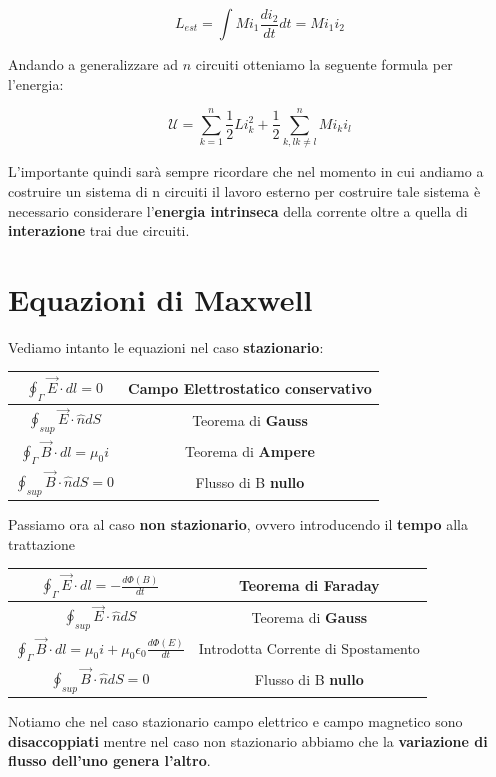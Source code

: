 $$
L_{est} = \int Mi_1\frac{di_2}{dt}dt = Mi_1i_2
$$

Andando a generalizzare ad $n$ circuiti otteniamo la seguente formula per l'energia: 

\begin{large}
	\begin{equation} \label{eq_energia_n_circuiti_RL}
		\mathcal{U} = \sum_{k=1}^{n} \frac{1}{2} Li_k^2  + \frac{1}{2} \sum_{k,l k\ne l}^n M i_k i_l
	\end{equation}
\end{large}

L'importante quindi sarà sempre ricordare che nel momento in cui andiamo a costruire un sistema di n circuiti il lavoro esterno per costruire tale sistema è necessario considerare l'\textbf{energia intrinseca} della corrente oltre a quella di \textbf{interazione} trai due circuiti. 


\section{Equazioni di Maxwell}
Vediamo intanto le equazioni nel caso \textbf{stazionario}: 
\bigskip

\begin{center}
\begin{large}
	\begin{tabular}{|c|c|}
		\hline
		$\oint_{\Gamma} \vec{E} \cdot dl = 0 $	& Campo Elettrostatico \textbf{conservativo} \\	
		\hline
		$\oint_{sup} \vec{E} \cdot \hat{n} dS$ & Teorema di \textbf{Gauss} \\
		\hline
		$\oint_{\Gamma} \vec{B} \cdot dl = \mu_0 i$ & Teorema di \textbf{Ampere} \\ 
		\hline
		$\oint_{sup} \vec{B} \cdot \hat{n}dS = 0$ &   Flusso di B \textbf{nullo} \\
		\hline
	\end{tabular}
\end{large}

\end{center}

\bigskip

Passiamo ora al caso \textbf{non stazionario}, ovvero introducendo il \textbf{tempo} alla trattazione

\bigskip

\begin{center}
	\begin{large}
		\begin{tabular}{|c|c|}
			\hline
			$\oint_{\Gamma} \vec{E} \cdot dl = -\frac{d\Phi(B)}{dt} $	& Teorema di \textbf{Faraday}\\	
			\hline
			$\oint_{sup} \vec{E} \cdot \hat{n} dS$ & Teorema di \textbf{Gauss} \\
			\hline
			$\oint_{\Gamma} \vec{B} \cdot dl = \mu_0 i + \mu_0\epsilon_0 \frac{d\Phi(E)}{dt}$ & Introdotta Corrente di Spostamento \\ 
			\hline
			$\oint_{sup} \vec{B} \cdot \hat{n}dS = 0$ &   Flusso di B \textbf{nullo} \\
			\hline
		\end{tabular}
	\end{large}
\end{center}

Notiamo che nel caso stazionario campo elettrico e campo magnetico sono \textbf{disaccoppiati} mentre nel caso non stazionario abbiamo che la \textbf{variazione di flusso dell'uno genera l'altro}.
